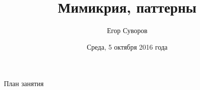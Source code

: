 \documentclass[utf8,xcolor=table]{beamer}
\title{Мимикрия, паттерны}
\author{Егор Суворов}
\institute[СПб АУ]{Курс <<Парадигмы и языки программирования>>, подгруппа 3}
\date[05.10.2016]{Среда, 5 октября 2016 года}
\begin{document}
\begin{frame}
\titlepage
\end{frame}

\begin{frame}{План занятия}
	\tableofcontents
\end{frame}











\end{document}
